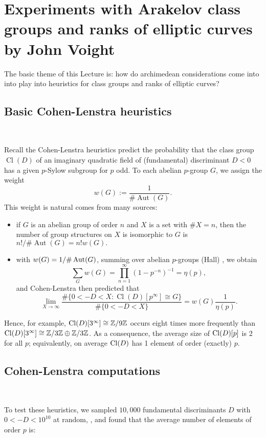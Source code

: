 \documentclass[12pt,amsfont]{amsart}
\begin{document}
\section{Experiments with Arakelov class groups and ranks of elliptic curves \\
by John Voight}\label{6}

The basic theme of this Lecture is: how do archimedean considerations come into into play into heuristics for class groups and ranks of elliptic curves? 

\subsection{Basic Cohen-Lenstra heuristics}
{\ }

Recall the Cohen-Lenstra heuristics  predict the probability that the class group $\operatorname{Cl}(D)$ of an imaginary quadratic field of (fundamental) discriminant $D < 0$ has a given $p$-Sylow subgroup for $p$ odd.  To each abelian $p$-group $G$, we assign the weight 
\[
w(G) := \frac{1}{\# \operatorname{Aut}(G)}.
\] 
This weight is natural comes from many sources:
\begin{itemize}
\item if $G$ is an abelian group of order $n$ and $X$ is a set with $\# X = n$, then the number of group structures on $X$ is isomorphic to $G$ is $n!/\# \operatorname{Aut}(G) = n! w(G).$ 
\item with $w(G) = 1/\# \operatorname{Aut}(G)$, summing over abelian $p$-groups (Hall) , we obtain
\[
\sum_G w(G) = \prod_{n=1}^\infty (1 - p^{-n})^{-1} = \eta(p),
\]
and Cohen-Lenstra then predicted that
\[ \lim_{X \rightarrow \infty} \frac{\# \{0< - D < X: \operatorname{Cl}(D) [p^\infty] \cong G\}}{\# \{0 < -D < X\}} = w(G) \frac{1}{\eta(p)}.
 \]
\end{itemize}
Hence, for example, $\operatorname{Cl}(D)[3^\infty] \cong {\mathbb Z}/9 {\mathbb Z}$ occurs eight times more frequently than $\operatorname{Cl}(D)[3^\infty] \cong {\mathbb Z}/3{\mathbb Z} \oplus {\mathbb Z} / 3{\mathbb Z}$. As a consequence, the average size of $\operatorname{Cl}(D)[p]$ is 2 for all $p$; equivalently, on average $\operatorname{Cl}(D)$ has 1 element of order (exactly) $p$. 

\subsection{Cohen-Lenstra computations}
{\ }

To test these heuristics, we sampled $10,000$ fundamental discriminants $D$ with $0 < -D < 10^{10}$ at random, , and found that the average number of elements of order $p$ is:
\end{document}

